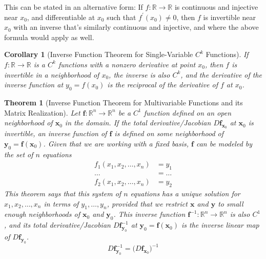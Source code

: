 \documentclass{article}
\newtheorem{theorem}{Theorem}[section]
\newtheorem{corollary}{Corollary}[theorem]
\theoremstyle{remark}
\theoremstyle{definition}
\begin{document}
This can be stated in an alternative form: If $f: \mathbb{R} \longrightarrow \mathbb{R}$ is continuous and injective near $x_0$, and differentiable at $x_0$ such that $f^\prime (x_0) \neq 0$, then $f$ is invertible near $x_0$ with an inverse that's similarly continuous and injective, and where the above formula would apply as well. 

\begin{corollary}[Inverse Function Theorem for Single-Variable $C^k$ Functions]
If $f: \mathbb{R} \longrightarrow \mathbb{R}$ is a $C^k$ functions with a nonzero derivative at point $x_0$, then $f$ is invertible in a neighborhood of $x_0$, the inverse is also $C^k$, and the derivative of the inverse function at $y_0 = f(x_0)$ is the reciprocal of the derivative of $f$ at $x_0$. 
\end{corollary}

\begin{theorem}[Inverse Function Theorem for Multivariable Functions and its Matrix Realization]
Let $\mathbf{f}: \mathbb{R}^n \longrightarrow \mathbb{R}^n$ be a $C^1$ function defined on an open neighborhood of $\mathbf{x}_0$ in the domain. If the total derivative/Jacobian $D \mathbf{f}_{\mathbf{x}_0}$ at $\mathbf{x}_0$ is invertible, an inverse function of $\mathbf{f}$ is defined on some neighborhood of $\mathbf{y}_0 = \mathbf{f}(\mathbf{x}_0)$. Given that we are working with a fixed basis, $\mathbf{f}$ can be modeled by the set of $n$ equations 
\begin{align*}
    f_1 (x_1, x_2, \ldots, x_n) &= y_1 \\
    \ldots & = \ldots \\
    f_2 (x_1, x_2, \ldots, x_n) &= y_2
\end{align*}
This theorem says that this system of $n$ equations has a unique solution for $x_1, x_2, \ldots, x_n$ in terms of $y_1, \ldots, y_n$, provided that we restrict $\mathbf{x}$ and $\mathbf{y}$ to small enough neighborhoods of $\mathbf{x}_0$ and $\mathbf{y}_0$. This inverse function $\mathbf{f}^{-1}: \mathbb{R}^n \longrightarrow \mathbb{R}^n$ is also $C^1$, and its total derivative/Jacobian $D \mathbf{f}^{-1}_{\mathbf{y}_0}$ at $\mathbf{y}_0 = \mathbf{f}(\mathbf{x}_0)$ is the inverse linear map of $D \mathbf{f}_{\mathbf{y}_0}$. 
\[D \mathbf{f}^{-1}_{\mathbf{y}_0} = \big( D \mathbf{f}_{\mathbf{x}_0} \big)^{-1}\]
\end{theorem}
\end{document}
